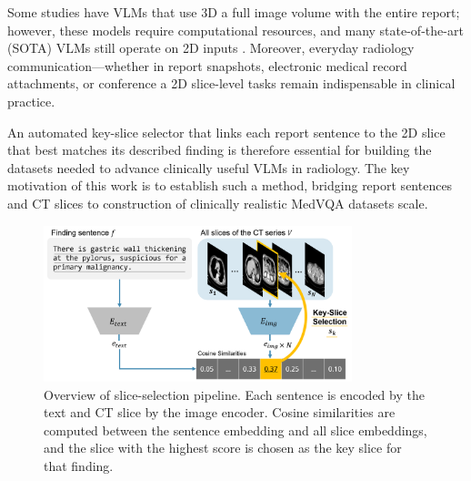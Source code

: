 \documentclass[bioengineering,article,submit,pdftex,moreauthors]{Definitions/mdpi}
\begin{document}
Some studies have  VLMs that use 3D   a full image volume with the entire report; however, these models require  computational resources, and many state-of-the-art (SOTA) VLMs still operate on 2D inputs \cite{bai_m3d_2024,blankemeier_merlin_2024,hamamci_ct2rep_2024}. 
Moreover, everyday radiology communication—whether in report snapshots, electronic medical record attachments, or conference     a   2D   slice-level tasks remain indispensable in clinical practice. 
 
An automated key-slice selector that links each report sentence to the 2D slice that best matches its described finding is therefore essential for building the datasets needed to advance clinically useful VLMs in radiology.
The key motivation of this work is to establish such a method, bridging report sentences and CT slices to   construction of clinically realistic MedVQA datasets   scale.

\begin{figure}[ht]
  \centering
  \includegraphics[width=0.8\textwidth]{./figures/figure1_9.png}
  \caption{
    Overview of   slice-selection pipeline. 
    Each  sentence is encoded by the text  and  CT slice by the image encoder. 
    Cosine similarities are computed between the sentence embedding and all slice embeddings, and the slice with the highest score is chosen as the key slice for that finding. 
}
  \label{fig:clip_overview}
\end{figure}
\end{document}
